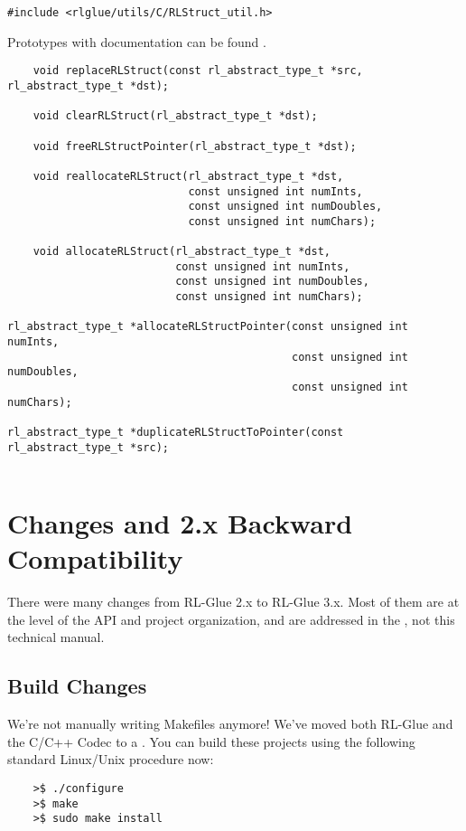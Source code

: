 \documentclass[11pt]{article}
\begin{document}
\begin{verbatim}
#include <rlglue/utils/C/RLStruct_util.h>
\end{verbatim}

Prototypes with documentation can be found .

\begin{verbatim}
	void replaceRLStruct(const rl_abstract_type_t *src, rl_abstract_type_t *dst);

	void clearRLStruct(rl_abstract_type_t *dst);

	void freeRLStructPointer(rl_abstract_type_t *dst);

	void reallocateRLStruct(rl_abstract_type_t *dst, 
                            const unsigned int numInts,
                            const unsigned int numDoubles,
                            const unsigned int numChars);

	void allocateRLStruct(rl_abstract_type_t *dst, 
                          const unsigned int numInts,
                          const unsigned int numDoubles, 
                          const unsigned int numChars);

rl_abstract_type_t *allocateRLStructPointer(const unsigned int numInts,
                                            const unsigned int numDoubles,
                                            const unsigned int numChars);

rl_abstract_type_t *duplicateRLStructToPointer(const rl_abstract_type_t *src);


\end{verbatim}



\section{Changes and 2.x Backward Compatibility}
There were many changes from RL-Glue 2.x to RL-Glue 3.x.  Most of them are at the level of the API and project organization, and are addressed in the , not this technical manual.

\subsection{Build Changes}
We're not manually writing Makefiles anymore!  We've moved both RL-Glue and the C/C++ Codec to a .
You can build these projects using the following standard Linux/Unix procedure now:
\begin{verbatim}
	>$ ./configure
	>$ make
	>$ sudo make install
\end{verbatim}
\end{document}
